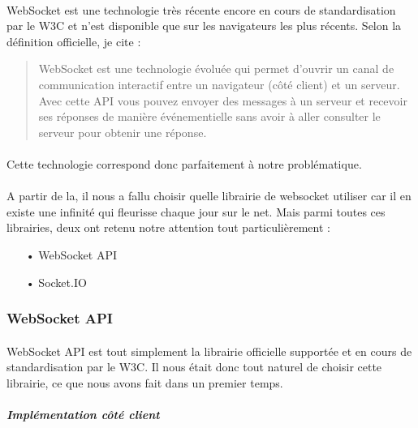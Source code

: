 \documentclass[a4paper,12pt]{report}
\begin{document}
	\paragraph*{}
	WebSocket est une technologie très récente encore en cours de standardisation par le W3C et n'est disponible que sur les navigateurs les plus récents.
	Selon la définition officielle, je cite : \\
	\begin{quotation}
	WebSocket est une technologie évoluée qui permet d'ouvrir un canal de communication interactif entre un navigateur (côté client) et un serveur. \\Avec cette API vous pouvez envoyer des messages à un serveur et recevoir ses réponses de manière événementielle sans avoir à aller consulter le serveur pour obtenir une réponse.
	\end{quotation}
	\paragraph*{}
	Cette technologie correspond donc parfaitement à notre problématique.
	\paragraph*{}
	A partir de la, il  nous a fallu choisir quelle librairie de websocket utiliser car il en existe une infinité qui fleurisse chaque jour sur le net. Mais parmi toutes ces librairies, deux ont retenu notre attention tout particulièrement :
	\\
	\begin{itemize}
		\item[•] WebSocket API 
		\item[•] Socket.IO
	\end{itemize}		
	\paragraph*{}
	\subsubsection{WebSocket API}
	\paragraph*{}
	WebSocket API est tout simplement la librairie officielle supportée et en cours de standardisation par le W3C.
	Il nous était donc tout naturel de choisir cette librairie, ce que nous avons fait dans un premier temps.
	\paragraph*{}
	\textit{\textbf{Implémentation côté client}} 
\end{document}
